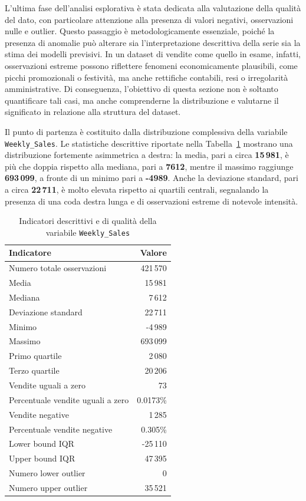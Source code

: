 \documentclass[a4paper,12pt]{article}
\begin{document}
L’ultima fase dell’analisi esplorativa è stata dedicata alla valutazione della qualità del dato, con particolare attenzione alla presenza di valori negativi, osservazioni nulle e outlier. Questo passaggio è metodologicamente essenziale, poiché la presenza di anomalie può alterare sia l’interpretazione descrittiva della serie sia la stima dei modelli previsivi. In un dataset di vendite come quello in esame, infatti, osservazioni estreme possono riflettere fenomeni economicamente plausibili, come picchi promozionali o festività, ma anche rettifiche contabili, resi o irregolarità amministrative. Di conseguenza, l’obiettivo di questa sezione non è soltanto quantificare tali casi, ma anche comprenderne la distribuzione e valutarne il significato in relazione alla struttura del dataset.

Il punto di partenza è costituito dalla distribuzione complessiva della variabile \texttt{Weekly\_Sales}. Le statistiche descrittive riportate nella Tabella~\ref{tab:weekly_sales_quality} mostrano una distribuzione fortemente asimmetrica a destra: la media, pari a circa \textbf{15\,981}, è più che doppia rispetto alla mediana, pari a \textbf{7612}, mentre il massimo raggiunge \textbf{693\,099}, a fronte di un minimo pari a \textbf{-4989}. Anche la deviazione standard, pari a circa \textbf{22\,711}, è molto elevata rispetto ai quartili centrali, segnalando la presenza di una coda destra lunga e di osservazioni estreme di notevole intensità.

\begin{table}[H]
\centering
\caption{Indicatori descrittivi e di qualità della variabile \texttt{Weekly\_Sales}}
\label{tab:weekly_sales_quality}
\begin{tabular}{lr}
\toprule
\textbf{Indicatore} & \textbf{Valore} \\
\midrule
Numero totale osservazioni & 421\,570 \\
Media & 15\,981 \\
Mediana & 7\,612 \\
Deviazione standard & 22\,711 \\
Minimo & -4\,989 \\
Massimo & 693\,099 \\
Primo quartile & 2\,080 \\
Terzo quartile & 20\,206 \\
Vendite uguali a zero & 73 \\
Percentuale vendite uguali a zero & 0.0173\% \\
Vendite negative & 1\,285 \\
Percentuale vendite negative & 0.305\% \\
Lower bound IQR & -25\,110 \\
Upper bound IQR & 47\,395 \\
Numero lower outlier & 0 \\
Numero upper outlier & 35\,521 \\
\bottomrule
\end{tabular}
\end{table}
\end{document}
